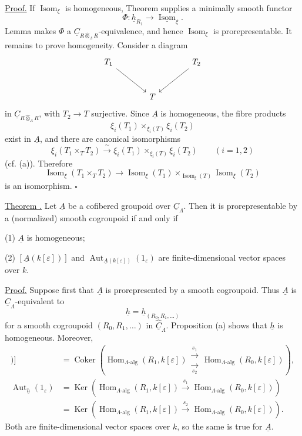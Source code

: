 \underline{Proof.} If $\operatorname{Isom}_\xi$ is homogeneous,
Theorem  supplies a minimally smooth functor
\[
 \Phi:\underline h_{R_1}\longrightarrow
 \underline{\operatorname{Isom}}_\xi.
\]
Lemma  makes $\Phi$ a
$\underline C_{R\widehat\otimes_\Lambda R}$-equivalence,
and hence $\operatorname{Isom}_\xi$ is prorepresentable. It remains
to prove homogeneity. Consider a diagram
\[
\begin{tikzcd}[column sep=large,row sep=large]
 T_1 \arrow[dr] && T_2 \arrow[dl]\\
 & T &
\end{tikzcd}
\]
in $\underline C_{R\widehat\otimes_\Lambda R}$, with
$T_2\longrightarrow T$ surjective. Since $\underline A$ is
homogeneous, the fibre products
\[
 \xi_i(T_1)\times_{\xi_i(T)}\xi_i(T_2)
\]
exist in $\underline A$, and there are canonical isomorphisms
\[
 \xi_i(T_1\times_TT_2)\xrightarrow{\ \sim\ }
 \xi_i(T_1)\times_{\xi_i(T)}\xi_i(T_2)
 \qquad(i=1,2)
\]
(cf. (a)). Therefore
\[
 \operatorname{Isom}_\xi(T_1\times_TT_2)
 \longrightarrow
 \operatorname{Isom}_\xi(T_1)
 \times_{\operatorname{Isom}_\xi(T)}
 \operatorname{Isom}_\xi(T_2)
\]
is an isomorphism. \hfill$\square$

\underline{Theorem .} Let $\underline A$ be a cofibered groupoid
over $\underline C_\Lambda$. Then it is prorepresentable by a
(normalized) smooth cogroupoid if and only if


(1) $\underline A$ is homogeneous;

(2) $[\underline A(k[\varepsilon])]$ and
$\operatorname{Aut}_{\underline A(k[\varepsilon])}(1_\varepsilon)$
are finite-dimensional vector spaces over $k$.

\underline{Proof.} Suppose first that $\underline A$ is
prorepresented by a smooth cogroupoid. Thus $\underline A$ is
$\underline C_\Lambda$-equivalent to
\[
 \underline h=\underline h_{(R_0,R_1,\ldots)}
\]
for a smooth cogroupoid $(R_0,R_1,\ldots)$ in
$\widehat{\underline C}_\Lambda$. Proposition (a) shows that
$\underline h$ is homogeneous. Moreover,
\begin{align*}
 [\underline h(k[\varepsilon])]
 &=\operatorname{Coker}\!\left(
   \operatorname{Hom}_{\Lambda\text{-alg}}(R_1,k[\varepsilon])
   \mathrel{\substack{\xrightarrow{\ s_1\ }\\[-.6ex]
                       \xrightarrow[\ s_2\ ]{}}}
   \operatorname{Hom}_{\Lambda\text{-alg}}(R_0,k[\varepsilon])
   \right),\\[1ex]
 \operatorname{Aut}_{\underline h}(1_\varepsilon)
 &=\operatorname{Ker}\!\left(
   \operatorname{Hom}_{\Lambda\text{-alg}}(R_1,k[\varepsilon])
   \xrightarrow{\ s_1\ }
   \operatorname{Hom}_{\Lambda\text{-alg}}(R_0,k[\varepsilon])
   \right)\\
 &=\operatorname{Ker}\!\left(
   \operatorname{Hom}_{\Lambda\text{-alg}}(R_1,k[\varepsilon])
   \xrightarrow{\ s_2\ }
   \operatorname{Hom}_{\Lambda\text{-alg}}(R_0,k[\varepsilon])
   \right).
\end{align*}
Both are finite-dimensional vector spaces over $k$, so the same is
true for $\underline A$.

